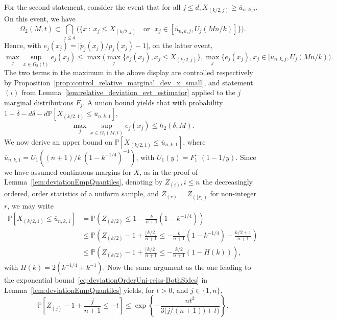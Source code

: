 \documentclass{article}
\numberwithin{equation}{section}
\renewcommand{\P}{\mathbb{P}}
\newcommand{\PP}{\P}%
\begin{document}
  For the second statement, consider the event that
  for all $j\le d, X_{(k/2,j)} \ge  \overline{ u}_{n,k,j}$. On this event,
  we have
   $$\Omega_2(M,t) \subset \bigcap_{j\le d} \bigg(\{ x~:~x_j\le X_{(k/2,j)} 
  \text{ ~ or ~}
  x_j \in [\overline u_{n,k,j}, U_j(Mn/k)]\} \bigg). %
  $$
  Hence,  with $e_j(x_j) = \Big| \tilde p_j(x_j)/p_j(x_j) - 1\Big|$, on the latter event, 
  $$
  \max_j\sup_{x \in \Omega_2(t)} e_j(x_j)  
  \le \max\Big( \max_j\{e_j(x_j), x_j \le X_{(k/2,j)} \},
  \max_{j} \{e_j(x_j), x_j \in [\overline u_{n,k,j}, U_j(Mn/k)\Big). 
  $$
  The two terms in the maximum in the above display are controlled respectively by Proposition~\ref{prop:control_relative_marginal_dev_x_small}, and statement $(i)$ from Lemma~\ref{lem:relative_deviation_evt_estimator}  applied to the $j$ marginal distributions $F_j$. A union bound yields that with probability $1 - \delta - d\delta - d\PP[X_{(k/2,1)} \le  \overline{ u}_{n,k,1}]$, 
  \begin{equation}
      \label{eq:bound_err_on_omega2}
      \max_j \sup_{x \in \Omega_2(M,t)} e_j(x_j) \le h_2(\delta,M). 
  \end{equation}
We now derive an upper bound on $\PP[X_{(k/2,1)}\le  \overline{ u}_{n,k,1}]$, where 
$\overline{ u}_{n,k,1} = U_1((n+1)/k ~(1-k^{-1/4})^{-1} )$, with $U_1(y) = F_1^\leftarrow(1-1/y)$. Since we have assumed continuous margins for $X$, as in the proof of Lemma~\ref{lem:deviationEmpQuantiles}, denoting by $Z_{(i)}, i\le n$ the decreasingly ordered, order statistics of a uniform sample, and $Z_{(r)} =Z_{ ( \lfloor r\rfloor )}$ for non-integer $r$,  we may write 
\begin{align*}
    \PP[  X_{(k/2,1)}\le  \overline{ u}_{n,k,1} ]
    & = \PP\left( Z_{(k/2)} \le 1 - \frac{k}{n+1}(1 - k^{-1/4})\right) \\
    & \le \PP\left( Z_{(k/2)}  - 1 + \frac{\lfloor k/2\rfloor}{n+1}  \le 
    - \frac{k}{n+1}(1 - k^{-1/4}) + \frac{k/2+1}{n+1} \right) \\
    &\le \PP\left( Z_{(k/2) } - 1 + \frac{\lfloor k/2\rfloor}{n+1} \le 
     -\frac{k/2}{n+1}(1-H(k))
    \right), 
\end{align*}
with $H(k) = 2(k^{-1/4} + k^{-1})$. Now the same argument as the one leading to the exponential bound~\eqref{eq:deviationOrderUni-reiss-BothSides} in Lemma~\ref{lem:deviationEmpQuantiles} yields, for $t>0$, and $j\in \{1,n\}$,  
$$
\PP[Z_{(j)} - 1 + \frac{j}{n+1} \le  -t] \le \exp\left\{
- \frac{n t^2}{3\big( j/(n+1)) + t\big) } 
\right\}.
$$
\end{document}
